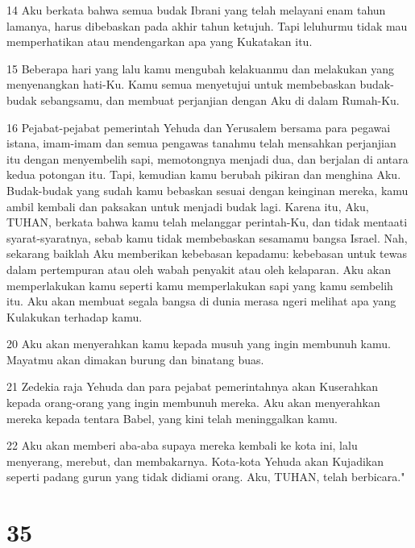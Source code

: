 \par 14 Aku berkata bahwa semua budak Ibrani yang telah melayani enam tahun lamanya, harus dibebaskan pada akhir tahun ketujuh. Tapi leluhurmu tidak mau memperhatikan atau mendengarkan apa yang Kukatakan itu.
\par 15 Beberapa hari yang lalu kamu mengubah kelakuanmu dan melakukan yang menyenangkan hati-Ku. Kamu semua menyetujui untuk membebaskan budak-budak sebangsamu, dan membuat perjanjian dengan Aku di dalam Rumah-Ku.
\par 16 Pejabat-pejabat pemerintah Yehuda dan Yerusalem bersama para pegawai istana, imam-imam dan semua pengawas tanahmu telah mensahkan perjanjian itu dengan menyembelih sapi, memotongnya menjadi dua, dan berjalan di antara kedua potongan itu. Tapi, kemudian kamu berubah pikiran dan menghina Aku. Budak-budak yang sudah kamu bebaskan sesuai dengan keinginan mereka, kamu ambil kembali dan paksakan untuk menjadi budak lagi. Karena itu, Aku, TUHAN, berkata bahwa kamu telah melanggar perintah-Ku, dan tidak mentaati syarat-syaratnya, sebab kamu tidak membebaskan sesamamu bangsa Israel. Nah, sekarang baiklah Aku memberikan kebebasan kepadamu: kebebasan untuk tewas dalam pertempuran atau oleh wabah penyakit atau oleh kelaparan. Aku akan memperlakukan kamu seperti kamu memperlakukan sapi yang kamu sembelih itu. Aku akan membuat segala bangsa di dunia merasa ngeri melihat apa yang Kulakukan terhadap kamu.
\par 20 Aku akan menyerahkan kamu kepada musuh yang ingin membunuh kamu. Mayatmu akan dimakan burung dan binatang buas.
\par 21 Zedekia raja Yehuda dan para pejabat pemerintahnya akan Kuserahkan kepada orang-orang yang ingin membunuh mereka. Aku akan menyerahkan mereka kepada tentara Babel, yang kini telah meninggalkan kamu.
\par 22 Aku akan memberi aba-aba supaya mereka kembali ke kota ini, lalu menyerang, merebut, dan membakarnya. Kota-kota Yehuda akan Kujadikan seperti padang gurun yang tidak didiami orang. Aku, TUHAN, telah berbicara."

\chapter{35}

